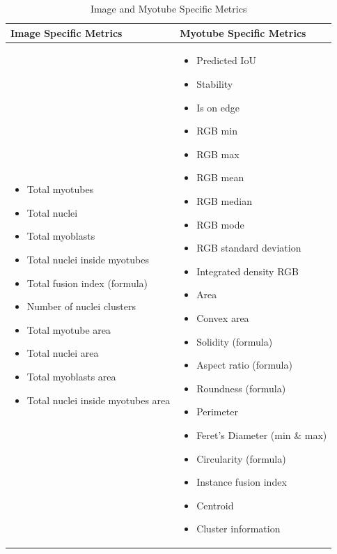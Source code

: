 \begin{table}[htbp]
	\centering
	\caption{Image and Myotube Specific Metrics}
	\begin{tabular}{|l|l|}
		\hline
		\textbf{Image Specific Metrics} & \textbf{Myotube Specific Metrics} \\
		\hline
		\begin{minipage}[t]{0.45\linewidth}
			\begin{itemize}[nosep,leftmargin=*]
				\item Total myotubes
				\item Total nuclei
				\item Total myoblasts
				\item Total nuclei inside myotubes
				\item Total fusion index (formula)
				\item Number of nuclei clusters
				\item Total myotube area
				\item Total nuclei area
				\item Total myoblasts area
				\item Total nuclei inside myotubes area
			\end{itemize}
		\end{minipage} &
		\begin{minipage}[t]{0.45\linewidth}
			\begin{itemize}[nosep,leftmargin=*]
				\item Predicted IoU
				\item Stability
				\item Is on edge
				\item RGB min
				\item RGB max
				\item RGB mean
				\item RGB median
				\item RGB mode
				\item RGB standard deviation
				\item Integrated density RGB
				\item Area
				\item Convex area
				\item Solidity (formula)
				\item Aspect ratio (formula)
				\item Roundness (formula)
				\item Perimeter
				\item Feret’s Diameter (min \& max)
				\item Circularity (formula)
				\item Instance fusion index
				\item Centroid
				\item Cluster information
			\end{itemize}
		\end{minipage} \\
		\hline
	\end{tabular}
	\label{tab:metrics}
\end{table}
